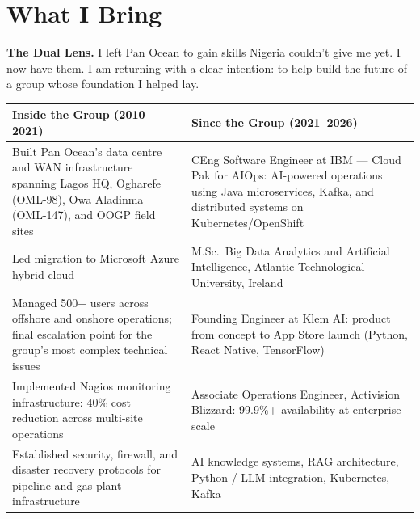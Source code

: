 \documentclass[10pt]{article}
\newcommand{\spacer}{\vspace{10pt}}
\newcommand{\bigspacer}{\vspace{16pt}}
\begin{document}
\bigspacer

\section{What I Bring}

\noindent\colorbox{primary!8}{%
\begin{minipage}{\dimexpr\textwidth-2\fboxsep}
  \vspace{6pt}
  \textbf{\color{primary}The Dual Lens.}\quad
  I left Pan Ocean to gain skills Nigeria couldn't give me yet. I now have
  them. I am returning with a clear intention: to help build the future of a
  group whose foundation I helped lay.
  \vspace{6pt}
\end{minipage}}

\spacer

\small
\begin{tabularx}{\columnwidth}{@{}XX@{}}
\toprule
\textbf{Inside the Group (2010--2021)} & \textbf{Since the Group (2021--2026)} \\
\midrule
Built Pan Ocean's data centre and WAN infrastructure spanning Lagos HQ,
Ogharefe (OML-98), Owa Aladinma (OML-147), and OOGP field sites
  & CEng Software Engineer at IBM --- Cloud Pak for AIOps:
    AI-powered operations using Java microservices, Kafka, and distributed
    systems on Kubernetes/OpenShift \\
Led migration to Microsoft Azure hybrid cloud
  & M.Sc.\ Big Data Analytics and Artificial Intelligence,
    Atlantic Technological University, Ireland \\
Managed 500+ users across offshore and onshore operations; final escalation
point for the group's most complex technical issues
  & Founding Engineer at Klem AI: product from concept to App Store launch
    (Python, React Native, TensorFlow) \\
Implemented Nagios monitoring infrastructure: 40\% cost reduction across
multi-site operations
  & Associate Operations Engineer, Activision Blizzard: 99.9\%+
    availability at enterprise scale \\
Established security, firewall, and disaster recovery protocols for pipeline
and gas plant infrastructure
  & AI knowledge systems, RAG architecture, Python / LLM integration,
    Kubernetes, Kafka \\
\bottomrule
\end{tabularx}
\normalsize
\end{document}
